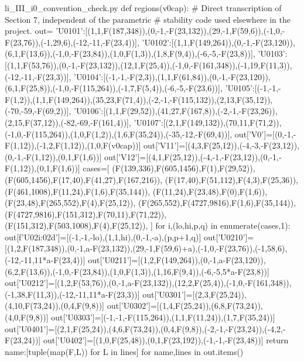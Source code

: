 \begin{filecontents*}[overwrite]{li_III_i0_convention_check.py}
def regions(v0cap):
    # Direct transcription of Section 7, independent of the parametric
    # stability code used elsewhere in the project.
    out={
        'U0101':[(1,1,F(187,348)),(0,-1,-F(23,132)),(29,-1,F(59,6)),(-1,0,-F(23,76)),(-1,29,6),(-12,-11,-F(23,4))],
        'U0102':[(1,1,F(149,264)),(0,-1,-F(23,120)),(6,1,F(13,6)),(-1,0,-F(23,84)),(1,0,F(1,3)),(1,8,F(9,4)),(-6,-5,-F(23,8))],
        'U0103':[(1,1,F(53,76)),(0,-1,-F(23,132)),(12,1,F(25,4)),(-1,0,-F(161,348)),(-1,19,F(11,3)),(-12,-11,-F(23,3))],
        'U0104':[(-1,-1,-F(2,3)),(1,1,F(61,84)),(0,-1,-F(23,120)),(6,1,F(25,8)),(-1,0,-F(115,264)),(-1,7,F(5,4)),(-6,-5,-F(23,6))],
        'U0105':[(-1,-1,-F(1,2)),(1,1,F(149,264)),(35,23,F(71,4)),(-2,-1,-F(115,132)),(2,13,F(35,12)),(-70,-59,-F(69,2))],
        'U0106':[(1,1,F(29,52)),(41,27,F(167,8)),(-2,-1,-F(23,26)),(2,15,F(37,12)),(-82,-69,-F(161,4))],
        'U0107':[(2,1,F(149,132)),(70,11,F(71,2)),(-1,0,-F(115,264)),(1,0,F(1,2)),(1,6,F(35,24)),(-35,-12,-F(69,4))],
    }
    out['V0']=[(0,-1,-F(1,12)),(-1,2,F(1,12)),(1,0,F(v0cap))]
    out['V11']=[(4,3,F(25,12)),(-4,-3,-F(23,12)),(0,-1,-F(1,12)),(0,1,F(1,6))]
    out['V12']=[(4,1,F(25,12)),(-4,-1,-F(23,12)),(0,-1,-F(1,12)),(0,1,F(1,6))]
    cases=[
        (F(139,336),F(605,1456),F(1),F(29,52)),
        (F(605,1456),F(17,40),F(41,27),F(167,216)),
        (F(17,40),F(51,112),F(4,3),F(25,36)),
        (F(461,1008),F(11,24),F(1,6),F(35,144)),
        (F(11,24),F(23,48),F(0),F(1,6)),
        (F(23,48),F(265,552),F(4),F(25,12)),
        (F(265,552),F(4727,9816),F(1,6),F(35,144)),
        (F(4727,9816),F(151,312),F(70,11),F(71,22)),
        (F(151,312),F(503,1008),F(4),F(25,12)),
    ]
    for i,(lo,hi,p,q) in enumerate(cases,1):
        out[f'U02{i:02d}']=[(-1,-1,-lo),(1,1,hi),(0,-1,-a),(p,p+1,q)]
    out['U0210']=[(1,2,F(187,348)),(0,-1,a-F(23,132)),(29,-1,F(59,6)+a),(-1,0,-F(23,76)),(-1,58,6),(-12,-11,11*a-F(23,4))]
    out['U0211']=[(1,2,F(149,264)),(0,-1,a-F(23,120)),(6,2,F(13,6)),(-1,0,-F(23,84)),(1,0,F(1,3)),(1,16,F(9,4)),(-6,-5,5*a-F(23,8))]
    out['U0212']=[(1,2,F(53,76)),(0,-1,a-F(23,132)),(12,2,F(25,4)),(-1,0,-F(161,348)),(-1,38,F(11,3)),(-12,-11,11*a-F(23,3))]
    out['U0301']=[(2,3,F(25,24)),(4,10,F(73,24)),(0,4,F(9,8))]
    out['U0302']=[(1,4,F(25,24)),(6,8,F(73,24)),(4,0,F(9,8))]
    out['U0303']=[(-1,-1,-F(115,264)),(1,1,F(11,24)),(1,7,F(35,24))]
    out['U0401']=[(2,1,F(25,24)),(4,6,F(73,24)),(0,4,F(9,8)),(-2,-1,-F(23,24)),(-4,2,-F(23,24))]
    out['U0402']=[(1,0,F(25,48)),(0,1,F(23,192)),(-1,-1,-F(23,48))]
    return {name:[tuple(map(F,L)) for L in lines] for name,lines in out.items()}


\end{filecontents*}
